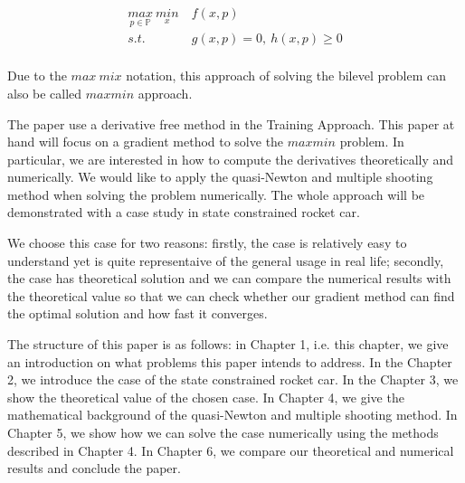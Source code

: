\begin{equation}
	\begin{aligned}
		\underset{p \in \mathbb{P}}{max} \ \underset{x}{min} & \  f(x,p) \\ 
		s.t.  & \  g(x, p) = 0, \  h(x,p)  \geq  0 \\
	\end{aligned}
\end{equation}

Due to the $max \ mix$ notation, this approach of solving the bilevel problem can also be called $max min$ approach. 

The paper \cite{MatSch22} use a derivative free method in the Training Approach. This paper at hand will focus on a gradient method to solve the $maxmin$ problem.  In particular, we are interested in how to compute the derivatives theoretically and numerically.  We would like to apply the quasi-Newton and multiple shooting method when solving the problem numerically. The whole approach will be demonstrated with a case study in state constrained rocket car. 

We choose this case for two reasons: firstly, the case is relatively easy to understand yet is quite representaive of the general usage in real life; secondly, the case has theoretical solution and we can compare the numerical results with the theoretical value so that we can check whether our gradient method can find the optimal solution and how fast it converges. 
 
The structure of this paper is as follows: in Chapter 1, i.e. this chapter,  we give an introduction on what problems this paper intends to address. In the Chapter 2, we introduce the case of the state constrained rocket car. In the Chapter 3, we show the theoretical value of the chosen case. In Chapter 4, we give the mathematical background of the quasi-Newton and multiple shooting method. In Chapter 5, we show how we can solve the case numerically using the methods described in Chapter 4. In Chapter 6, we compare our theoretical and numerical results and conclude the paper. 








